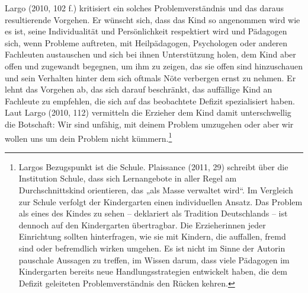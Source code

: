 Largo (2010, 102 f.) kritisiert ein solches Problemverständnis und das daraus resultierende Vorgehen. Er wünscht sich, dass das Kind so angenommen wird wie es ist, seine Individualität und Persönlichkeit respektiert wird und Pädagogen sich, wenn Probleme auftreten, mit Heilpädagogen, Psychologen oder anderen Fachleuten austauschen und sich bei ihnen Unterstützung holen, dem Kind aber offen und zugewandt begegnen, um ihm zu zeigen, das sie offen sind hinzuschauen und sein Verhalten hinter dem sich oftmals Nöte verbergen ernst zu nehmen. Er lehnt das Vorgehen ab, das sich darauf beschränkt, das auffällige Kind an Fachleute zu empfehlen, die sich auf das beobachtete Defizit spezialisiert haben. Laut Largo (2010, 112) vermitteln die Erzieher dem Kind damit unterschwellig die Botschaft: Wir sind unfähig, mit deinem Problem umzugehen oder aber wir wollen uns um dein Problem nicht kümmern.\footnote{Largos Bezugspunkt ist die Schule. Plaissance (2011, 29) schreibt über die Institution Schule, dass sich Lernangebote in aller Regel am Durchschnittskind orientieren, das „als Masse verwaltet wird“. Im Vergleich zur Schule verfolgt der Kindergarten einen individuellen Ansatz. Das Problem als eines des Kindes zu sehen -- deklariert als Tradition Deutschlands -- ist dennoch auf den Kindergarten übertragbar. Die Erzieherinnen jeder Einrichtung sollten hinterfragen, wie sie mit Kindern, die auffallen, fremd sind oder befremdlich wirken umgehen. Es ist nicht im Sinne der Autorin pauschale Aussagen zu treffen, im Wissen darum, dass viele Pädagogen im Kindergarten bereits neue Handlungsstrategien entwickelt haben, die dem Defizit geleiteten Problemverständnis den Rücken kehren.} 

